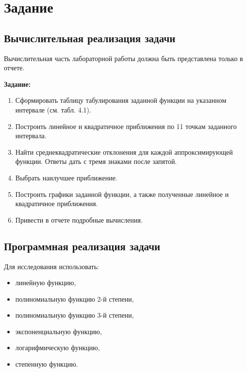 \documentclass{article}
\begin{document}
\itmo[
      variant=13,
      labn=4,
      discipline=Вычислительная математика,
      group=P3212,
      student=Соколов Анатолий Владимирович,
      teacher=Наумова Надежда Александровна 
]
\lstset{language=rust}
\tableofcontents
\section{Задание}
      \subsection{Вычислительная реализация задачи}

      Вычислительная часть лабораторной работы должна быть представлена только в отчете.

            \textbf{Задание:}
            \begin{enumerate}
            \item Сформировать таблицу табулирования заданной функции на указанном интервале (см. табл. 4.1).
            \item Построить линейное и квадратичное приближения по 11 точкам заданного интервала.
            \item Найти среднеквадратические отклонения для каждой аппроксимирующей функции. Ответы дать с тремя знаками после запятой.
            \item Выбрать наилучшее приближение.
            \item Построить графики заданной функции, а также полученные линейное и квадратичное приближения.
            \item Привести в отчете подробные вычисления.
            \end{enumerate}

      \subsection{Программная реализация задачи}

            Для исследования использовать:
            \begin{itemize}
            \item линейную функцию,
                  \item полиномиальную функцию 2-й степени,
                  \item полиномиальную функцию 3-й степени,
                  \item экспоненциальную функцию,
                  \item логарифмическую функцию,
                  \item степенную функцию.
            \end{itemize}
\end{document}
